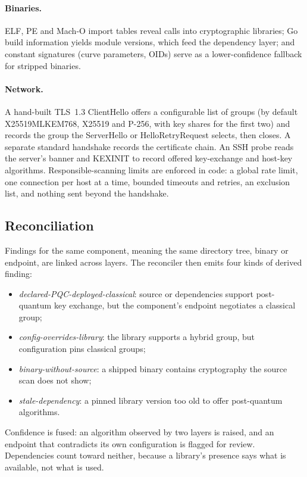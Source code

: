 \paragraph{Binaries.} ELF, PE and Mach-O import tables reveal calls into
cryptographic libraries; Go build information yields module versions, which
feed the dependency layer; and constant signatures (curve parameters, OIDs)
serve as a lower-confidence fallback for stripped binaries.

\paragraph{Network.} A hand-built TLS~1.3 ClientHello offers a configurable
list of groups (by default X25519MLKEM768, X25519 and P-256, with key shares
for the first two) and records the group the ServerHello or
HelloRetryRequest selects, then closes. A separate standard handshake records
the certificate chain. An SSH probe reads the server's banner and KEXINIT to
record offered key-exchange and host-key algorithms. Responsible-scanning
limits are enforced in code: a global rate limit, one connection per host at a
time, bounded timeouts and retries, an exclusion list, and nothing sent beyond
the handshake.

\subsection{Reconciliation}

Findings for the same component, meaning the same directory tree, binary or
endpoint, are linked across layers. The reconciler then emits four kinds of
derived finding:
\begin{itemize}
\item \emph{declared-PQC-deployed-classical}: source or dependencies support
  post-quantum key exchange, but the component's endpoint negotiates a
  classical group;
\item \emph{config-overrides-library}: the library supports a hybrid group,
  but configuration pins classical groups;
\item \emph{binary-without-source}: a shipped binary contains cryptography the
  source scan does not show;
\item \emph{stale-dependency}: a pinned library version too old to offer
  post-quantum algorithms.
\end{itemize}
Confidence is fused: an algorithm observed by two layers is raised, and an
endpoint that contradicts its own configuration is flagged for review.
Dependencies count toward neither, because a library's presence says what is
available, not what is used.

